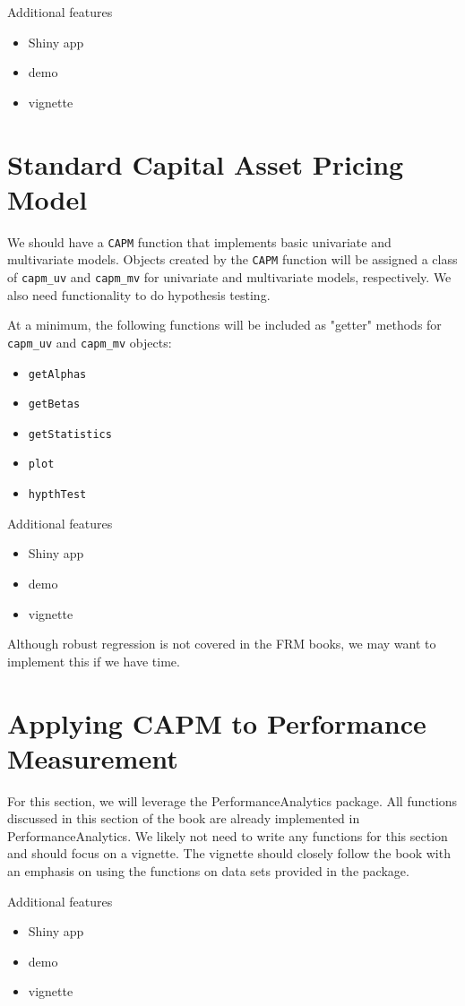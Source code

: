 \documentclass[12pt]{amsart}
\begin{document}
Additional features
\begin{itemize}
\item Shiny app
\item demo
\item vignette
\end{itemize}

\section{Standard Capital Asset Pricing Model}
We should have a \verb"CAPM" function that implements basic univariate and multivariate models. Objects created by the \verb"CAPM" function will be assigned a class of \verb"capm_uv" and \verb"capm_mv" for univariate and multivariate models, respectively. We also need functionality to do hypothesis testing.

At a minimum, the following functions will be included as "getter" methods for \verb"capm_uv" and \verb"capm_mv" objects:
\begin{itemize}
\item \verb"getAlphas"
\item \verb"getBetas"
\item \verb"getStatistics"
\item \verb"plot"
\item \verb"hypthTest"
\end{itemize}

Additional features
\begin{itemize}
\item Shiny app
\item demo
\item vignette
\end{itemize}

Although robust regression is not covered in the FRM books, we may want to implement this if we have time.

\section{Applying CAPM to Performance Measurement}
For this section, we will leverage the PerformanceAnalytics package. All functions discussed in this section of the book are already implemented in PerformanceAnalytics. We likely not need to write any functions for this section and should focus on a vignette. The vignette should closely follow the book with an emphasis on using the functions on data sets provided in the package.

Additional features
\begin{itemize}
\item Shiny app
\item demo
\item vignette
\end{itemize}
\end{document}
